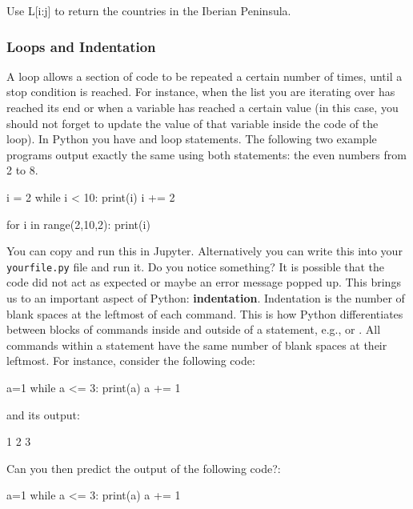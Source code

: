 \begin{exercise}
 Use L[i:j] to return the countries in the Iberian Peninsula.
\end{exercise}

\subsubsection{Loops and Indentation}

A loop allows a section of code to be repeated a certain number of times, until
a stop condition is reached. For instance, when the list you are iterating over has
reached its end or when a variable has reached a certain value (in this case,
you should not forget to update the value of that variable inside the code of
the loop). In Python you have  and  loop statements. The
following two example programs output exactly the same using both statements:
the even numbers from 2 to 8.

\begin{python}
i = 2
while i < 10:
  print(i)
  i += 2 
\end{python}

\begin{python}
for i in range(2,10,2):
    print(i)
\end{python}

You can copy and run this in Jupyter. Alternatively you can write this into your
\texttt{yourfile.py} file and run it. Do you notice something? It is possible
that the code did not act as expected or maybe an error message popped up. This
brings us to an important aspect of Python: \textbf{indentation}. Indentation
is the number of blank spaces at the leftmost of each command. This is how
Python differentiates between blocks of commands inside and outside of a
statement, e.g.,  or . All commands within a
statement have the same number of blank spaces at their leftmost. For instance,
consider the following code: 

\begin{python}
a=1
while a <= 3:
    print(a)
    a += 1
\end{python}

\noindent and its output:

\begin{python}
1
2
3
\end{python}


\begin{exercise}
Can you then predict the output of the following code?:

\begin{python}
a=1
while a <= 3:
    print(a)
a += 1
\end{python}

\end{exercise}

